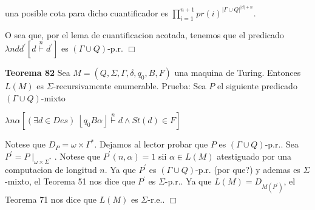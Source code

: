 una posible cota para dicho cuantificador es
\(\displaystyle \prod_{i=1}^{n+1}pr(i)^{\left\vert \Gamma \cup Q\right\vert ^{\left\vert d\right\vert +n}}\text{.} \)

O sea que, por el lema de cuantificacion acotada, tenemos que el predicado \( \lambda ndd^{\prime }\left[ d\overset{n}{\vdash }d^{\prime }\right] \) es \( (\Gamma \cup Q)\)-p.r. \(\Box\)




\textbf{Teorema 82} Sea \(M=\left( Q,\Sigma ,\Gamma ,\delta ,q_{0},B,F\right) \) una maquina de Turing. Entonces \(L(M)\) es \(\Sigma \)-recursivamente enumerable.
Prueba: Sea \(P\) el siguiente predicado \((\Gamma \cup Q)\)-mixto

\(\displaystyle \lambda n\alpha \left[ (\exists d\in Des)\;\left\lfloor q_{0}B\alpha \right\rfloor \overset{n}{\vdash }d\wedge St(d)\in F\right] \)

Notese que \(D_{P}=\omega \times \Gamma ^{\ast }\). Dejamos al lector probar que \(P\) es \((\Gamma \cup Q)\)-p.r.. Sea \(P^{\prime }=P\mid _{\omega \times \Sigma ^{\ast }}\). Notese que \(P^{\prime }(n,\alpha )=1\) sii \(\alpha \in L(M) \) atestiguado por una computacion de longitud \(n\). Ya que \(P^{\prime }\) es \((\Gamma \cup Q)\)-p.r. (por que?) y ademas es \(\Sigma \)-mixto, el Teorema 51 nos dice que \(P^{\prime }\) es \(\Sigma \)-p.r.. Ya que \( L(M)=D_{M(P^{\prime })}\), el Teorema 71 nos dice que \( L(M)\) es \(\Sigma \)-r.e.. \(\Box\)
